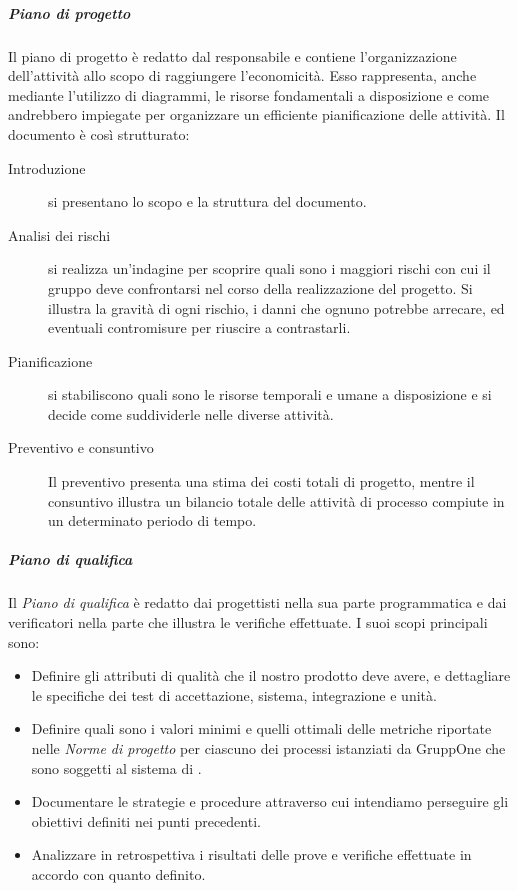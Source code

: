 \documentclass[../../norme-di-progetto.tex]{subfiles}
\begin{document}
\subparagraph{Piano di progetto}%
\label{subp:piano_di_progetto}
Il piano di progetto è redatto dal responsabile e contiene l'organizzazione dell'attività allo scopo di raggiungere l'economicità.
Esso rappresenta, anche mediante l'utilizzo di diagrammi, le risorse fondamentali a disposizione e come andrebbero impiegate per organizzare un efficiente pianificazione delle attività.
Il documento è così strutturato:
\begin{description}
  \item [Introduzione] si presentano lo scopo e la struttura del documento.
  \item [Analisi dei rischi] si realizza un'indagine per scoprire quali sono i maggiori rischi con cui il gruppo deve confrontarsi nel corso della realizzazione del progetto. Si illustra la gravità di ogni rischio, i danni che ognuno potrebbe arrecare, ed eventuali contromisure per riuscire a contrastarli.
  \item [Pianificazione] si stabiliscono quali sono le risorse temporali e umane a disposizione e si decide come suddividerle nelle diverse attività.
  \item [Preventivo e consuntivo] Il preventivo presenta una stima dei costi totali di progetto, mentre il consuntivo illustra un bilancio totale delle attività di processo compiute in un determinato periodo di tempo.
\end{description}

\subparagraph{Piano di qualifica}%
\label{subp:piano_di_qualifica}
Il \textit{Piano di qualifica} è redatto dai progettisti nella sua parte programmatica e dai verificatori nella parte che illustra le verifiche effettuate.
I suoi scopi principali sono:

\begin{itemize}
  \item Definire gli attributi di qualità che il nostro prodotto deve avere, e dettagliare le specifiche dei test di accettazione, sistema, integrazione e unità.
  \item Definire quali sono i valori minimi e quelli ottimali delle metriche riportate nelle \textit{Norme di progetto} per ciascuno dei processi istanziati da GruppOne che sono soggetti al sistema di .
  \item Documentare le strategie e procedure attraverso cui intendiamo perseguire gli obiettivi definiti nei punti precedenti.
  \item Analizzare in retrospettiva i risultati delle prove e verifiche effettuate in accordo con quanto definito.
\end{itemize}
\end{document}
